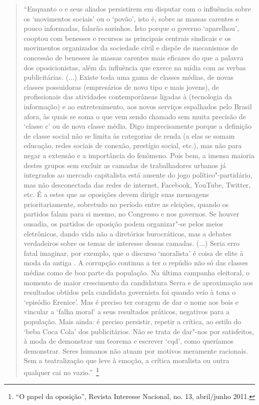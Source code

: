 \begin{quote}
``Enquanto o  e seus aliados persistirem em disputar com o 
influência sobre os `movimentos sociais' ou o `povão', isto é, sobre as
massas carentes e pouco informadas, falarão sozinhos. Isto porque o
governo `aparelhou', cooptou com benesses e recursos as principais
centrais sindicais e os movimentos organizados da sociedade civil e
dispõe de mecanismos de concessão de benesses às massas carentes mais
eficazes do que a palavra dos oposicionistas, além da influência que
exerce na mídia com as verbas publicitárias. (...) Existe toda uma gama
de classes médias, de novas classes possuidoras (empresários de novo
tipo e mais jovens), de profissionais das atividades contemporâneas
ligadas à  (tecnologia da informação) e ao entretenimento, aos novos
serviços espalhados pelo Brasil afora, às quais se soma o que vem sendo
chamado sem muita precisão de `classe c' ou de nova classe média. Digo
imprecisamente porque a definição de classe social não se limita às
categorias de renda (a elas se somam educação, redes sociais de conexão,
prestígio social, etc.), mas não para negar a extensão e a importância
do fenômeno. Pois bem, a imensa maioria destes grupos sem excluir as
camadas de trabalhadores urbanos já integrados ao mercado capitalista
está ausente do jogo político"-partidário, mas não desconectada das redes
de internet, Facebook, YouTube, Twitter, etc. É a estes que as oposições
devem dirigir suas mensagens prioritariamente, sobretudo no período
entre as eleições, quando os partidos falam para si mesmo, no Congresso
e nos governos. Se houver ousadia, os partidos de oposição podem
organizar"-se pelos meios eletrônicos, dando vida não a diretórios
burocráticos, mas a debates verdadeiros sobre os temas de interesse
dessas camadas. (...) Seria erro fatal imaginar, por exemplo, que o
discurso `moralista' é coisa de elite à moda da antiga . A corrupção
continua a ter o repúdio não só das classes médias como de boa parte da
população. Na última campanha eleitoral, o momento de maior crescimento
da candidatura Serra e de aproximação aos resultados obtidos pela
candidata governista foi quando veio à tona o `episódio Erenice'. Mas é
preciso ter coragem de dar o nome aos bois e vincular a `falha moral' a
seus resultados práticos, negativos para a população. Mais ainda: é
preciso persistir, repetir a crítica, ao estilo do `beba Coca Cola' dos
publicitários. Não se trata de dar"-nos por satisfeitos, à moda de
demonstrar um teorema e escrever `cqd', como queríamos demonstrar. Seres
humanos não atuam por motivos meramente racionais. Sem a teatralização
que leve à emoção, a crítica moralista ou outra qualquer cai no
vazio.''~\footnote{``O papel da oposição'', Revista Interesse Nacional,
  no. 13, abril/junho 2011.}


\end{quote}
